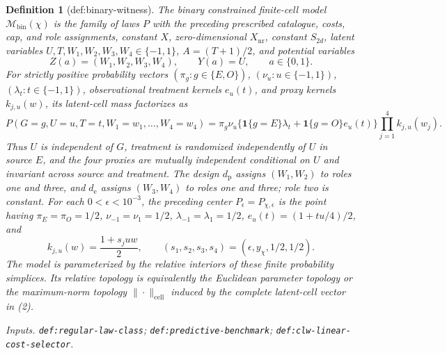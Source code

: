 \documentclass{article}
\newtheorem{definition}{Definition}
\begin{document}
\begin{definition}[def:binary-witness]
The \emph{binary constrained finite-cell model} \(\mathcal M_{\mathrm{bin}}(\chi)\) is the family of laws \(P\) with the preceding prescribed catalogue, costs, cap, and role assignments, constant \(X\), zero-dimensional \(X_{\mathrm{nr}}\), constant \(S_{2d}\), latent variables \(U,T,W_1,W_2,W_3,W_4\in\{-1,1\}\), \(A=(T+1)/2\), and potential variables
\[
 Z(a)=(W_1,W_2,W_3,W_4),\qquad Y(a)=U,
 \qquad a\in\{0,1\}.
\]
For strictly positive probability vectors \((\pi_g:g\in\{E,O\})\), \((\nu_u:u\in\{-1,1\})\), \((\lambda_t:t\in\{-1,1\})\), observational treatment kernels \(e_u(t)\), and proxy kernels \(k_{j,u}(w)\), its latent-cell mass factorizes as
\[
 P(G=g,U=u,T=t,W_1=w_1,\ldots,W_4=w_4)
 =\pi_g\nu_u\bigl\{\mathbf 1\{g=E\}\lambda_t
 +\mathbf 1\{g=O\}e_u(t)\bigr\}
 \prod_{j=1}^4k_{j,u}(w_j).                               \tag{2}
\]
Thus \(U\) is independent of \(G\), treatment is randomized independently of \(U\) in source \(E\), and the four proxies are mutually independent conditional on \(U\) and invariant across source and treatment. The design \(d_{\mathrm p}\) assigns \((W_1,W_2)\) to roles one and three, and \(d_{\mathrm e}\) assigns \((W_3,W_4)\) to roles one and three; role two is constant. For each \(0<\epsilon<10^{-3}\), the preceding center \(P_{\epsilon}=P_{\chi,\epsilon}\) is the point having \(\pi_E=\pi_O=1/2\), \(\nu_{-1}=\nu_1=1/2\), \(\lambda_{-1}=\lambda_1=1/2\), \(e_u(t)=(1+tu/4)/2\), and
\[
 k_{j,u}(w)=\frac{1+s_juw}{2},
 \qquad
 (s_1,s_2,s_3,s_4)=(\epsilon,y_{\chi},1/2,1/2).
\]
The model is parameterized by the relative interiors of these finite probability simplices. Its relative topology is equivalently the Euclidean parameter topology or the maximum-norm topology \(\|\cdot\|_{\mathrm{cell}}\) induced by the complete latent-cell vector in (2).
\par\smallskip\noindent\emph{Inputs.} \texttt{def:\allowbreak{}regular-\allowbreak{}law-\allowbreak{}class}; \texttt{def:\allowbreak{}predictive-\allowbreak{}benchmark}; \texttt{def:\allowbreak{}clw-\allowbreak{}linear-\allowbreak{}cost-\allowbreak{}selector}.
\end{definition}
\end{document}

